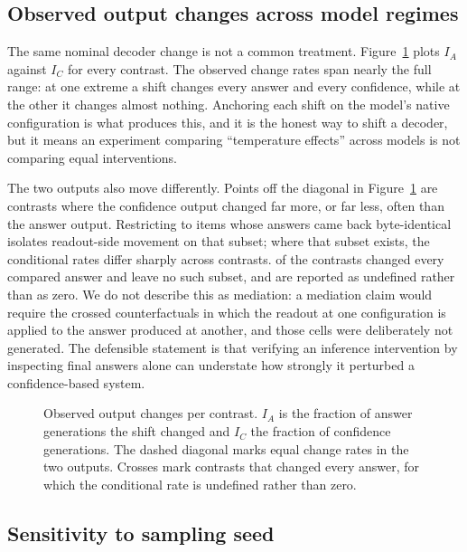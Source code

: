 \documentclass[information,article,submit,moreauthors]{Definitions/mdpi}
\begin{document}


\subsection{Observed output changes across model regimes}
\label{sec:realisation}

The same nominal decoder change is not a common treatment.
Figure~\ref{fig:realisation} plots $I_A$ against $I_C$ for every contrast.
The observed change rates span nearly the full range: at one extreme a shift
changes every answer and every confidence, while at the other it changes almost
nothing. Anchoring
each shift on the model's native configuration is what produces this, and it is
the honest way to shift a decoder, but it means an experiment comparing
``temperature effects'' across models is not comparing equal interventions.

The two outputs also move differently. Points off the diagonal in
Figure~\ref{fig:realisation} are contrasts where the confidence output changed
far more, or far less, often than the answer output. Restricting to items whose
answers came back byte-identical isolates readout-side movement on that subset;
where that subset exists, the conditional rates differ sharply across contrasts.
\NumAllAnswersChanged{} of the \NumContrasts{} contrasts changed every compared answer and leave
no such subset, and are reported as undefined rather than as zero. We do not
describe this as mediation: a mediation claim would require the crossed
counterfactuals in which the readout at one configuration is applied to the answer
produced at another, and those cells were deliberately not generated. The
defensible statement is that verifying an inference intervention by inspecting
final answers alone can understate how strongly it perturbed a confidence-based
system.

\begin{figure}[H]
\centering

\caption{Observed output changes per contrast. $I_A$ is the fraction of answer
generations the shift changed and $I_C$ the fraction of confidence generations.
The dashed diagonal marks equal change rates in the two outputs. Crosses mark
contrasts that changed every answer, for which the conditional rate is
undefined rather than zero.\label{fig:realisation}}
\end{figure}

\subsection{Sensitivity to sampling seed}
\label{sec:seeds}
\end{document}

